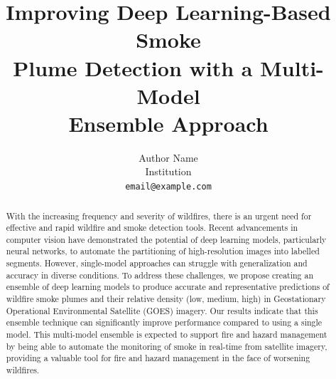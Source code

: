 \documentclass{article}
\title{Improving Deep Learning-Based Smoke\\ Plume Detection with a Multi-Model\\ Ensemble Approach}
\author{Author Name \\
Institution \\
\texttt{email@example.com}
}
\begin{document}
\maketitle


\begin{abstract}
With the increasing frequency and severity of wildfires, there is an urgent need for effective and rapid wildfire and smoke detection tools. Recent advancements in computer vision have demonstrated the potential of deep learning models, particularly neural networks, to automate the partitioning of high-resolution images into labelled segments. However, single-model approaches can struggle with generalization and accuracy in diverse conditions. To address these challenges, we propose creating an ensemble of deep learning models to produce accurate and representative predictions of wildfire smoke plumes and their relative density (low, medium, high) in Geostationary Operational Environmental Satellite (GOES) imagery. Our results indicate that this ensemble technique can significantly improve performance compared to using a single model. This multi-model ensemble is expected to support fire and hazard management by being able to automate the monitoring of smoke in real-time from satellite imagery, providing a valuable tool for fire and hazard management in the face of worsening wildfires.
\end{abstract}
\end{document}
